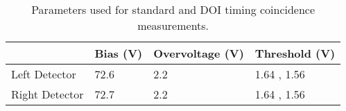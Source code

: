 \begin{table}
\caption{\label{tab:optimumparam} Parameters used for standard and DOI timing coincidence measurements.} 
\begin{tabular}{llll}
\hline
{} & Bias (V) & Overvoltage (V) & Threshold (V) \\
\hline
Left Detector  &     72.6 &             2.2 &   1.64 , 1.56 \\
Right Detector &     72.7 &             2.2 &   1.64 , 1.56 \\
\hline
\end{tabular}
\end{table}

